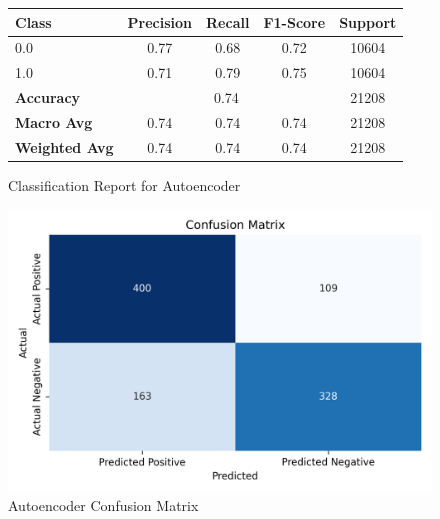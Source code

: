 \begin{figure}[h!]
    \centering
    \begin{minipage}[b]{0.4\textwidth}
        \centering
        \begin{tabular}{lcccc}
            \hline
            \textbf{Class} & \textbf{Precision} & \textbf{Recall} & \textbf{F1-Score} & \textbf{Support} \\
            \hline
            0.0 & 0.77 & 0.68 & 0.72 & 10604 \\
            1.0 & 0.71 & 0.79 & 0.75 & 10604 \\
            \hline
            \textbf{Accuracy} & \multicolumn{3}{c}{0.74} & 21208 \\
            \textbf{Macro Avg} & 0.74 & 0.74 & 0.74 & 21208 \\
            \textbf{Weighted Avg} & 0.74 & 0.74 & 0.74 & 21208 \\
            \hline
        \end{tabular}
        \caption{Classification Report for Autoencoder}
        \label{tab:autoencoder_classification_report}

        \vspace{1.5cm}
    \end{minipage}
    \hfill
    \begin{minipage}[b]{0.4\textwidth}
        \centering
        \includegraphics[width=\textwidth]{images/autoencoder_confusion_matrix.png}
        \caption{Autoencoder Confusion Matrix}
        \label{fig:autoencoder_cfm}
    \end{minipage}
\end{figure}
